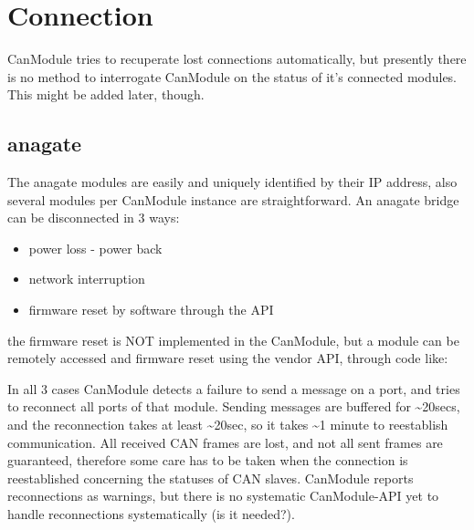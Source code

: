 \documentclass[letterpaper,10pt,english]{sphinxmanual}
\begin{document}
\chapter{Connection}
\label{\detokenize{connection:connection}}\label{\detokenize{connection::doc}}
CanModule tries to recuperate lost connections automatically, but presently there is no method
to interrogate CanModule on the status of it’s connected modules. This might be added later, though.


\section{anagate}
\label{\detokenize{connection:anagate}}
The anagate modules are easily and uniquely identified by their IP address, also several modules
per CanModule instance are straightforward. An anagate bridge can be disconnected in 3 ways:
\begin{itemize}
\item {} 
power loss - power back

\item {} 
network interruption

\item {} 
firmware reset by software through the API

\end{itemize}

the firmware reset is NOT implemented in the CanModule, but a module can be remotely accessed and
firmware reset using the vendor API, through code like:

\begin{sphinxVerbatim}[commandchars=\\\{\}]
    
      
\end{sphinxVerbatim}

In all 3 cases CanModule detects a failure to send a message on a port, and tries to reconnect
all ports of that module. Sending messages are buffered for \textasciitilde{}20secs, and the reconnection
takes at least \textasciitilde{}20sec, so it takes \textasciitilde{}1 minute to reestablish communication. All received CAN frames
are lost, and not all sent frames are guaranteed, therefore some care has to be taken when the
connection is reestablished concerning the statuses of CAN slaves. CanModule reports reconnections
as warnings, but there is no systematic CanModule-API yet to handle reconnections
systematically (is it needed?).
\end{document}
